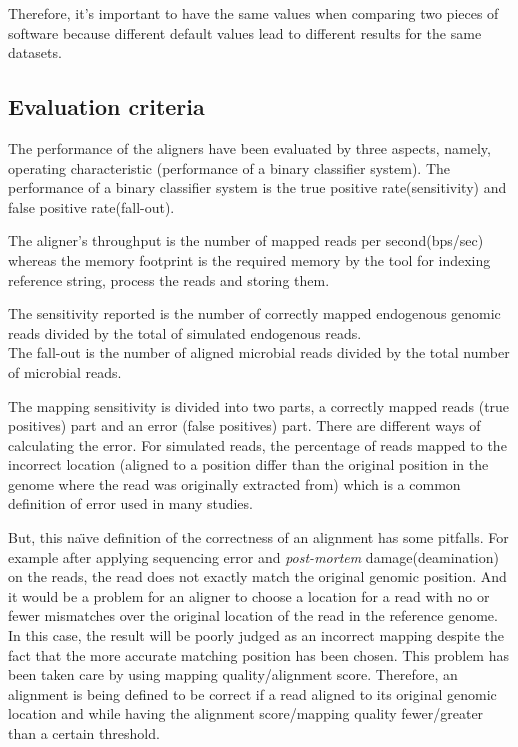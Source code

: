 \documentclass[11pt,a4paper]{report}
\begin{document}
Therefore, it's important to have the same values when comparing two pieces of software because different default values lead to different results for the same datasets.\\


\subsection{Evaluation criteria} \label{Evaluation criteria}
The performance of the aligners have been evaluated by three aspects, namely, 
operating characteristic (performance of a binary classifier system).
The performance of a binary classifier system is the true positive rate(sensitivity) and false positive rate(fall-out).


The aligner's throughput is the number of mapped reads per second(bps/sec)
whereas the memory footprint is the required memory by the tool for indexing reference string, process the reads and storing them. 

The sensitivity reported is the number of correctly mapped 
endogenous genomic reads divided by the total  of simulated endogenous reads.\\ 
The fall-out is the number of aligned  microbial reads 
divided by the total number of  microbial reads.

The mapping sensitivity is divided into two parts, a correctly mapped reads (true positives) part and an error (false positives) part. 
There are different ways of calculating the error. For simulated reads,
 the percentage of reads mapped to the incorrect location (aligned to a position differ than the original position in the genome where the read was originally extracted from) which is a common definition of error used in many studies\cite{ErrorDef}. 

But, this na\"\i ve definition of the correctness of an alignment has some pitfalls. For example after applying sequencing error and \emph{post-mortem} damage(deamination) on the reads, the read does not exactly match the original genomic position. And it would be a problem for an aligner to choose a location for a read with no or fewer mismatches over the original location of the read in the reference genome. In this case, the result will be poorly judged as an incorrect mapping despite the fact that the more accurate matching position has been chosen. 
This problem has been taken care by using mapping quality/alignment score. Therefore, an alignment is being defined to be correct if a read aligned to its original genomic location and while having the alignment score/mapping quality fewer/greater than a certain threshold. 
\end{document}
